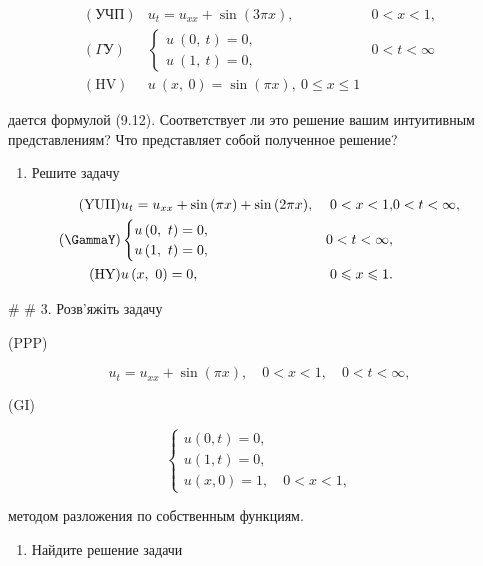 \documentclass[
  ukrainian,
]{article}
\providecommand{\tightlist}{%
  \setlength{\itemsep}{0pt}\setlength{\parskip}{0pt}}
\begin{document}
\[
\begin{aligned} (\text{УЧП}) & u_t = u_{xx} + \sin{(3\pi x)}, & 0 < x < 1, \\ (\Gamma \text{У}) & \begin{cases} u \ (0, \ t) = 0, \\ u \ (1, \ t) = 0, \end{cases} & 0 < t < \infty \\ (\text{HV}) & u \ (x, \ 0) = \sin{(\pi x)}, \ 0 \leqslant x \leqslant 1 \end{aligned}
\]

дается формулой (9.12). Соответствует ли это решение вашим интуитивным
представлениям? Что представляет собой полученное решение?

\begin{enumerate}
\def\labelenumi{\arabic{enumi}.}
\setcounter{enumi}{1}
\tightlist
\item
  Решите задачу
\end{enumerate}

\[
\begin{aligned} (\text{YUII}) & u_t = u_{xx} + \sin{(\pi x)} + \sin{(2\pi x)}, & 0 < x < 1, & 0 <t < \infty, \\ (\text{\GammaY}) & \begin{cases} u\left(0,\ t\right) = 0, \\ u\left(1,\ t\right) = 0, \end{cases} & 0 < t < \infty, \\ (\text{HY}) & u\left(x,\ 0\right) = 0, & 0 \leqslant x \leqslant 1. \end{aligned}
\]

\# \# 3. Розв'яжіть задачу

(PPP)

\[
u_t = u_{xx} + \sin(\pi x), \quad 0 < x < 1, \quad 0 < t < \infty,
\]

(GI)

\[
\begin{cases} u(0, t) = 0, \\ u(1, t) = 0, \\ u(x, 0) = 1, \quad 0 < x < 1, \end{cases}
\]

методом разложения по собственным функциям.

\begin{enumerate}
\def\labelenumi{\arabic{enumi}.}
\setcounter{enumi}{3}
\tightlist
\item
  Найдите решение задачи
\end{enumerate}
\end{document}
